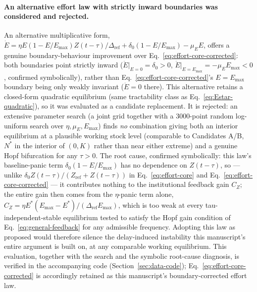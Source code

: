 \documentclass[twocolumn,10pt]{article}
\begin{document}
\paragraph{An alternative effort law with strictly inward boundaries was considered and rejected.} An alternative multiplicative form, $\dot E=\eta E(1-E/E_{\max})Z(t-\tau)/\Delta_{\text{ref}}+\delta_0(1-E/E_{\max})-\mu_EE$, offers a genuine boundary-behaviour improvement over Eq.~\eqref{eq:effort-core-corrected}: both boundaries point strictly inward ($\dot E|_{E=0}=\delta_0>0$, $\dot E|_{E=E_{\max}}=-\mu_EE_{\max}<0$, confirmed symbolically), rather than Eq.~\eqref{eq:effort-core-corrected}'s $E=E_{\max}$ boundary being only weakly invariant ($\dot E=0$ there). This alternative retains a closed-form quadratic equilibrium (same tractability class as Eq.~\eqref{eq:Estar-quadratic}), so it was evaluated as a candidate replacement. It is rejected: an extensive parameter search (a joint grid together with a 3000-point random log-uniform search over $\eta,\mu_E,E_{\max}$) finds \emph{no} combination giving both an interior equilibrium at a plausible working stock level (comparable to Candidates A/B, $N^*$ in the interior of $(0,K)$ rather than near either extreme) and a genuine Hopf bifurcation for any $\tau>0$. The root cause, confirmed symbolically: this law's baseline-panic term $\delta_0(1-E/E_{\max})$ has no dependence on $Z(t-\tau)$, so --- unlike $\delta_0Z(t-\tau)/(Z_{\text{ref}}+Z(t-\tau))$ in Eq.~\eqref{eq:effort-core} and Eq.~\eqref{eq:effort-core-corrected} --- it contributes nothing to the institutional feedback gain $C_Z$; the entire gain then comes from the $\eta$-panic term alone, $C_Z=\eta E^*(E_{\max}-E^*)/(\Delta_{\text{ref}}E_{\max})$, which is too weak at every tau-independent-stable equilibrium tested to satisfy the Hopf gain condition of Eq.~\eqref{eq:general-feedback} for any admissible frequency. Adopting this law as proposed would therefore silence the delay-induced instability this manuscript's entire argument is built on, at any comparable working equilibrium. This evaluation, together with the search and the symbolic root-cause diagnosis, is verified in the accompanying code (Section~\ref{sec:data-code}); Eq.~\eqref{eq:effort-core-corrected} is accordingly retained as this manuscript's boundary-corrected effort law.
\end{document}
